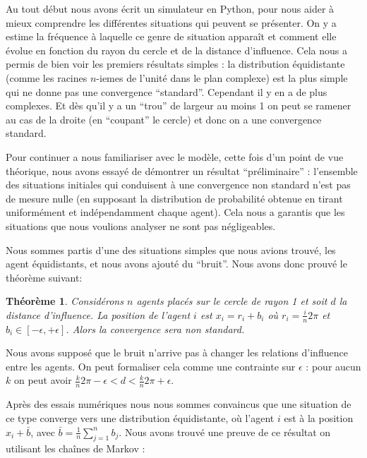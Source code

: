\documentclass[a4paper,10pt]{article}
\newtheorem{theorem}{Théorème}
\begin{document}
Au tout début nous avons écrit un simulateur en Python, pour nous aider à mieux comprendre les différentes situations qui peuvent se présenter. On y a estime la fréquence à laquelle ce genre de situation apparaît et comment elle évolue en fonction du rayon du cercle et de la distance d'influence. Cela nous a permis de bien voir les premiers résultats simples : la distribution équidistante (comme les racines $n$-iemes de l’unité dans le plan complexe) est la plus simple qui ne donne pas une convergence ``standard''. Cependant il y en a de plus complexes. Et dès qu'il y a un ``trou'' de largeur au moins 1 on peut se ramener au cas de la droite (en ``coupant'' le cercle) et donc on a une convergence standard.

Pour continuer a nous familiariser avec le modèle, cette fois d'un point de vue théorique, nous avons essayé de démontrer un résultat ``préliminaire'' : l'ensemble des situations initiales qui conduisent à une convergence non standard n'est pas de mesure nulle (en supposant la distribution de probabilité obtenue en tirant uniformément et indépendamment chaque agent). Cela nous a garantis que les situations que nous voulions analyser ne sont pas négligeables.

Nous sommes partis d'une des situations simples que nous avions trouvé, les agent équidistants, et nous avons ajouté du ``bruit''. Nous avons donc prouvé le théorème suivant:
\begin{theorem}
Considérons $n$ agents placés sur le cercle de rayon 1 et soit $d$ la distance d'influence. La position de l'agent $i$ est $x_i = r_i + b_i$ où $r_i = \frac{i}{n} 2 \pi$ et $b_i \in [-\epsilon, +\epsilon]$. Alors la convergence sera non standard.
\end{theorem}

Nous avons supposé que le bruit n'arrive pas à changer les relations d'influence entre les agents. On peut formaliser cela comme une contrainte sur $\epsilon$ : pour aucun $k$ on peut avoir $\frac{k}{n} 2 \pi - \epsilon < d < \frac{k}{n} 2 \pi + \epsilon$.

Après des essais numériques nous nous sommes convaincus que une situation de ce type converge vers une distribution équidistante, où l'agent $i$ est à la position $x_i + \bar b$, avec $\bar b = \frac{1}{n} \sum_{j=1}^n b_j$. Nous avons trouvé une preuve de ce résultat on utilisant les chaînes de Markov :
\end{document}
